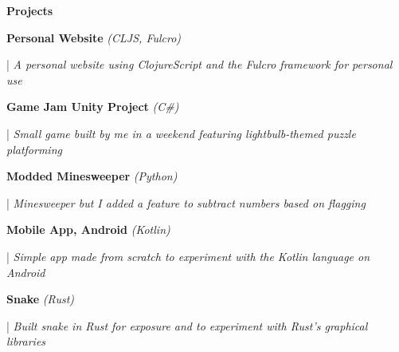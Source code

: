 \documentclass[letterpaper,11pt]{article}
\begin{document}
\textbf{\large \textcolor{magic_blue}{Projects}}


\begin{minipage}[t]{0.28\textwidth}
    \raggedright
    \textbf{ Personal Website }\textit{(CLJS, Fulcro)} \\
\end{minipage}
\hfill
\begin{minipage}[t]{0.70\textwidth}
    \raggedright
    |\textit{ A personal website using ClojureScript and the Fulcro framework for personal use} \\
\end{minipage}

\begin{minipage}[t]{0.28\textwidth}
    \raggedright
    \textbf{ Game Jam Unity Project }\textit{(C\#)} \\
\end{minipage}
\hfill
\begin{minipage}[t]{0.70\textwidth}
    \raggedright
    |\textit{ Small game built by me in a weekend featuring lightbulb-themed puzzle platforming} \\
\end{minipage}

\begin{minipage}[t]{0.28\textwidth}
    \raggedright
    \textbf{ Modded Minesweeper }\textit{(Python)} \\
\end{minipage}
\hfill
\begin{minipage}[t]{0.70\textwidth}
    \raggedright
    |\textit{ Minesweeper but I added a feature to subtract numbers based on flagging} \\
\end{minipage}

\begin{minipage}[t]{0.28\textwidth}
    \raggedright
    \textbf{ Mobile App, Android }\textit{(Kotlin)} \\
\end{minipage}
\hfill
\begin{minipage}[t]{0.70\textwidth}
    \raggedright
    |\textit{ Simple app made from scratch to experiment with the Kotlin language on Android} \\
\end{minipage}

\begin{minipage}[t]{0.28\textwidth}
    \raggedright
    \textbf{ Snake }\textit{(Rust)}\\
\end{minipage}
\hfill
\begin{minipage}[t]{0.70\textwidth}
    \raggedright
    |\textit{ Built snake in Rust for exposure and to experiment with Rust's graphical libraries} \\
\end{minipage}
\end{document}
